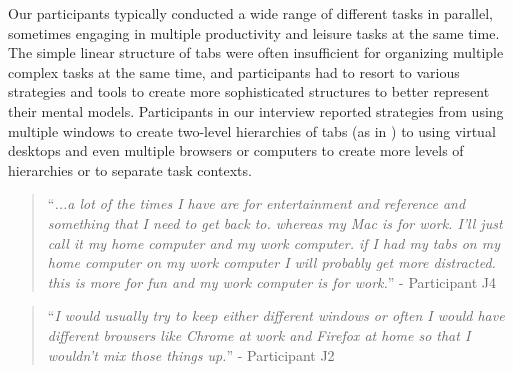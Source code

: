 Our participants typically conducted a wide range of different tasks in parallel, sometimes engaging in multiple productivity and leisure tasks at the same time. 
The simple linear structure of tabs were often insufficient for organizing multiple complex tasks at the same time, and participants had to resort to various strategies and tools to create more sophisticated structures to better represent their mental models. Participants in our interview reported strategies from using multiple windows to create two-level hierarchies of tabs (as in  \cite{Dubroy:2010:STB:1753326.1753426}) to using virtual desktops and even multiple browsers or computers to create more levels of hierarchies or to separate task contexts. 



\begin{quote}
``\emph{...a lot of the times I have are for entertainment and reference and something that I need to get back to. whereas my Mac is for work. I'll just call it my home computer and my work computer. if I had my tabs on my home computer on my work computer I will probably get more distracted. this is more for fun and my work computer is for work.}'' - Participant J4
\end{quote}

\begin{quote}
``\emph{I would usually try to keep either different windows or often I would have different browsers like Chrome at work and Firefox at home so that I wouldn't mix those things up.}'' - Participant J2
\end{quote}

